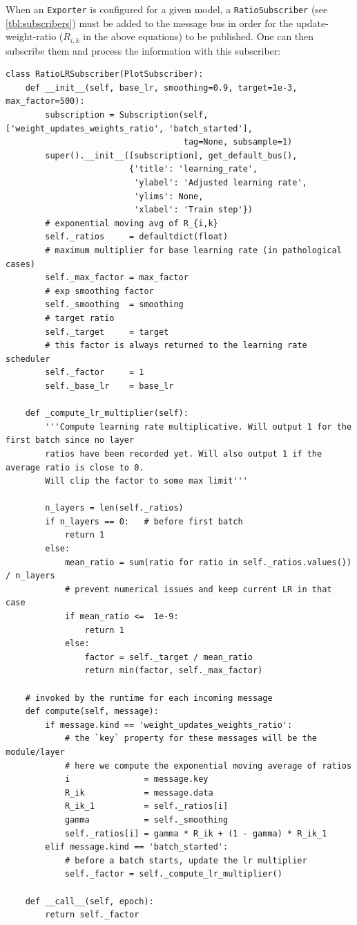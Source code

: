 When an \verb+Exporter+ is configured for a given model, a
\verb+RatioSubscriber+ (see \cref{tbl:subscribers}) must be added to the message
bus in order for the update-weight-ratio ($R_{i,k}$ in the above equations) to be
published. One can then subscribe them and process the information with this
subscriber:
\begin{lstlisting}[label={lst:ratiolr-sub}, caption={Ratio-Based LR subscriber
and scheduler}]
class RatioLRSubscriber(PlotSubscriber):
    def __init__(self, base_lr, smoothing=0.9, target=1e-3, max_factor=500):
        subscription = Subscription(self, ['weight_updates_weights_ratio', 'batch_started'],
                                    tag=None, subsample=1)
        super().__init__([subscription], get_default_bus(),
                         {'title': 'learning_rate',
                          'ylabel': 'Adjusted learning rate',
                          'ylims': None,
                          'xlabel': 'Train step'})
        # exponential moving avg of R_{i,k}
        self._ratios     = defaultdict(float)
        # maximum multiplier for base learning rate (in pathological cases)
        self._max_factor = max_factor
        # exp smoothing factor
        self._smoothing  = smoothing
        # target ratio
        self._target     = target
        # this factor is always returned to the learning rate scheduler
        self._factor     = 1
        self._base_lr    = base_lr

    def _compute_lr_multiplier(self):
        '''Compute learning rate multiplicative. Will output 1 for the first batch since no layer
        ratios have been recorded yet. Will also output 1 if the average ratio is close to 0.
        Will clip the factor to some max limit'''

        n_layers = len(self._ratios)
        if n_layers == 0:   # before first batch
            return 1
        else:
            mean_ratio = sum(ratio for ratio in self._ratios.values()) / n_layers
            # prevent numerical issues and keep current LR in that case
            if mean_ratio <=  1e-9:
                return 1
            else:
                factor = self._target / mean_ratio
                return min(factor, self._max_factor)

    # invoked by the runtime for each incoming message
    def compute(self, message):
        if message.kind == 'weight_updates_weights_ratio':
            # the `key` property for these messages will be the module/layer
            # here we compute the exponential moving average of ratios
            i               = message.key
            R_ik            = message.data
            R_ik_1          = self._ratios[i]
            gamma           = self._smoothing
            self._ratios[i] = gamma * R_ik + (1 - gamma) * R_ik_1
        elif message.kind == 'batch_started':
            # before a batch starts, update the lr multiplier
            self._factor = self._compute_lr_multiplier()

    def __call__(self, epoch):
        return self._factor
\end{lstlisting}

